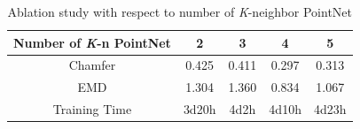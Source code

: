 \begin{table}
	\caption{Ablation study with respect to number of \textit{K}-neighbor PointNet}
	\label{tab:pointnet}
	\centering
	\begin{tabular}{c | c c c c}
		Number of \textit{K}-n PointNet &  2 & 3 & 4 & 5 \\
		\hline
		Chamfer      & 0.425 &  0.411 & 0.297 & 0.313 \\
		EMD			 & 1.304 &  1.360 & 0.834 & 1.067 \\
		\hline
		Training Time& 3d20h &   4d2h   & 4d10h & 4d23h
	\end{tabular}
\end{table}


